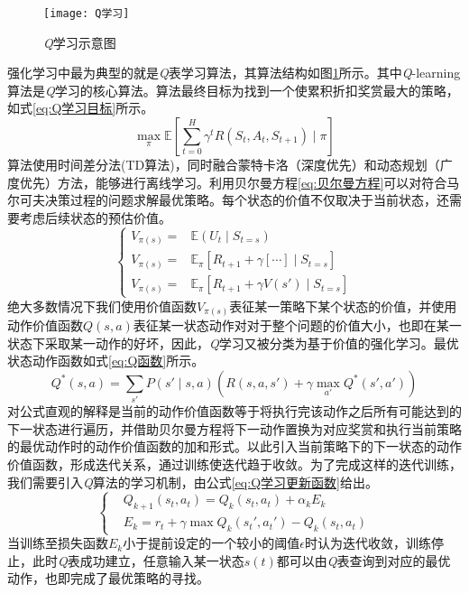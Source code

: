 \begin{figure}[h]
	\centering
	\texttt{[image: Q学习]}
	\caption{\textit{Q}学习示意图}
	\label{fig:Q学习}
\end{figure}

强化学习中最为典型的就是\textit{Q}表学习算法，其算法结构如图\ref{fig:Q学习}所示。其中\textit{Q}-learning算法是\textit{Q}学习的核心算法。算法最终目标为找到一个使累积折扣奖赏最大的策略，如式\ref{eq:Q学习目标}所示。
\begin{equation}\label{eq:Q学习目标}
\underset{\pi}{\max }\mathbb{E}\left [ \sum_{t=0}^{H}\gamma^{t}R\left ( S_{t},A_{t},S_{t+1} \right )\mid\pi \right ]
\end{equation}
算法使用时间差分法(TD算法)，同时融合蒙特卡洛（深度优先）和动态规划（广度优先）方法，能够进行离线学习。利用贝尔曼方程\ref{eq:贝尔曼方程}可以对符合马尔可夫决策过程的问题求解最优策略。每个状态的价值不仅取决于当前状态，还需要考虑后续状态的预估价值。
\begin{equation}\label{eq:贝尔曼方程}
\left\lbrace 
\begin{aligned}
V_{\pi(s)}=&\mathbb{E}\left ( U_{t}\mid S_{t=s} \right )\\
V_{\pi(s)}=&\mathbb{E}_{\pi}\left [ R_{t+1}+\gamma \left [ \cdots \right ]\mid S_{t=s} \right ]\\
V_{\pi(s)}=&\mathbb{E}_{\pi}\left [ R_{t+1}+\gamma V\left ( {s}' \right )\mid S_{t=s} \right ]
\end{aligned}
\right.
\end{equation}
绝大多数情况下我们使用价值函数$V_{\pi(s)}$表征某一策略下某个状态的价值，并使用动作价值函数$Q(s,a)$表征某一状态动作对对于整个问题的价值大小，也即在某一状态下采取某一动作的好坏，因此，\textit{Q}学习又被分类为基于价值的强化学习。最优状态动作函数如式\ref{eq:Q函数}所示。
\begin{equation}\label{eq:Q函数}
Q^{*}\left ( s,a \right )=\sum _{{s}'}P\left ( {s}'\mid s,a \right )\left ( R\left ( s,a,{s}' \right ) +\gamma\max _{{a}'}Q^{*}\left ( {s}' ,{a}'\right )\right )
\end{equation}
对公式直观的解释是当前的动作价值函数等于将执行完该动作之后所有可能达到的下一状态进行遍历，并借助贝尔曼方程将下一动作置换为对应奖赏和执行当前策略的最优动作时的动作价值函数的加和形式。以此引入当前策略下的下一状态的动作价值函数，形成迭代关系，通过训练使迭代趋于收敛。为了完成这样的迭代训练，我们需要引入\textit{Q}算法的学习机制，由公式\ref{eq:Q学习更新函数}给出。
\begin{equation}\label{eq:Q学习更新函数}
\left\lbrace 
\begin{aligned}
&Q_{k+1}\left ( s_{t},a_{t} \right )=Q_{k}\left ( s_{t},a_{t} \right )+\alpha_{k}E_{k}\\
&E_{k}=r_{t}+\gamma\max Q_{k}\left ( {s_{t}}' ,{a_{t}}'\right )-Q_{k}\left ( s_{t},a_{t}\right )
\end{aligned}
\right.
\end{equation}
当训练至损失函数$E_{k}$小于提前设定的一个较小的阈值$\epsilon$时认为迭代收敛，训练停止，此时\textit{Q}表成功建立，任意输入某一状态$s(t)$都可以由\textit{Q}表查询到对应的最优动作，也即完成了最优策略的寻找。
